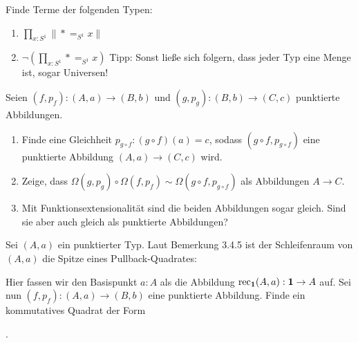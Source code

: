 \documentclass{uebung}
\begin{document}

\begin{exercise}
  Finde Terme der folgenden Typen:
  \begin{enumerate}
    \item $\prod_{x:S^1}\|\ast =_{S^1} x\|$
    \item $\neg\left(\prod_{x:S^1}\ast =_{S^1} x\right)$
      {\tiny Tipp: Sonst ließe sich folgern, dass jeder Typ eine Menge ist, sogar Universen!}
  \end{enumerate}
\end{exercise}

\begin{exercise}
  Seien $(f,p_f):(A,a)\to (B,b)$ und $(g,p_g):(B,b)\to (C,c)$ punktierte Abbildungen.
  \begin{enumerate}
    \item Finde eine Gleichheit $p_{g\circ f}:(g\circ f)(a)=c$, sodass $(g\circ f,p_{g\circ f})$ eine punktierte Abbildung $(A,a)\to (C,c)$ wird.
    \item Zeige, dass $\Omega(g,p_g)\circ\Omega(f,p_f) \sim \Omega(g\circ f,p_{g\circ f})$ als Abbildungen $A\to C$.
    \item Mit Funktionsextensionalität sind die beiden Abbildungen sogar gleich.
      Sind sie aber auch gleich als punktierte Abbildungen?
  \end{enumerate}
\end{exercise}

\begin{exercise}
  Sei $(A,a)$ ein punktierter Typ.
  Laut Bemerkung 3.4.5 ist der Schleifenraum von $(A,a)$ die Spitze eines Pullback-Quadrates:
  \begin{center}
  \end{center}
  Hier fassen wir den Basispunkt $a:A$ als die Abbildung $\mathrm{rec}_{\mathbf{1}}(A,a):\mathbf{1} \to A$ auf.
  Sei nun $(f,p_f):(A,a)\to (B,b)$ eine punktierte Abbildung.
  Finde ein kommutatives Quadrat der Form
  \begin{center}
    .
  \end{center}
\end{exercise}
\end{document}
